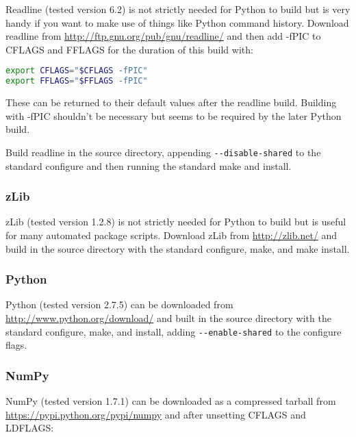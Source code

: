 Readline (tested version 6.2) is not strictly needed for Python to build but is
very handy if you want to make use of things like Python command history.
Download readline from \url{http://ftp.gnu.org/pub/gnu/readline/} and then add
-fPIC to CFLAGS and FFLAGS for the duration of this build with:

\begin{lstlisting}[language=bash]
export CFLAGS="$CFLAGS -fPIC"
export FFLAGS="$FFLAGS -fPIC"
\end{lstlisting}

These can be returned to their default values after the readline build.
Building with -fPIC shouldn't be necessary but seems to be required by the
later Python build.

Build readline in the source directory, appending
\lstinline[language=bash]+--disable-shared+ to the standard configure and then
running the standard make and install.

\subsubsection{zLib}
\label{sec:required_libraries_python_zlib}

zLib (tested version 1.2.8) is not strictly needed for Python to build but is
useful for many automated package scripts. Download zLib from 
\url{http://zlib.net/} and build in the source directory with the standard
configure, make, and make install.

\subsubsection{Python}
\label{sec:required_libraries_python_python}

Python (tested version 2.7.5) can be downloaded from
\url{http://www.python.org/download/} and built in the source directory with
the standard configure, make, and install, adding
\lstinline[language=bash]+--enable-shared+ to the configure flags.

\subsubsection{NumPy}
\label{sec:required_libraries_python_numpy}

NumPy (tested version 1.7.1) can be downloaded as a compressed tarball from
\url{https://pypi.python.org/pypi/numpy} and after unsetting CFLAGS and
LDFLAGS:

